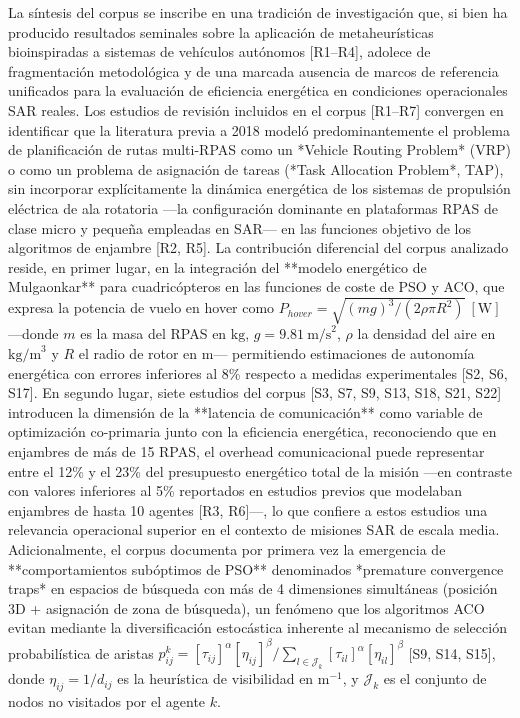La síntesis del corpus se inscribe en una tradición de investigación que, si bien ha producido resultados seminales sobre la aplicación de metaheurísticas bioinspiradas a sistemas de vehículos autónomos [R1–R4], adolece de fragmentación metodológica y de una marcada ausencia de marcos de referencia unificados para la evaluación de eficiencia energética en condiciones operacionales SAR reales. Los estudios de revisión incluidos en el corpus [R1–R7] convergen en identificar que la literatura previa a 2018 modeló predominantemente el problema de planificación de rutas multi-RPAS como un *Vehicle Routing Problem* (VRP) o como un problema de asignación de tareas (*Task Allocation Problem*, TAP), sin incorporar explícitamente la dinámica energética de los sistemas de propulsión eléctrica de ala rotatoria —la configuración dominante en plataformas RPAS de clase micro y pequeña empleadas en SAR— en las funciones objetivo de los algoritmos de enjambre [R2, R5]. La contribución diferencial del corpus analizado reside, en primer lugar, en la integración del **modelo energético de Mulgaonkar** para cuadricópteros en las funciones de coste de PSO y ACO, que expresa la potencia de vuelo en hover como $P_{hover} = \sqrt{(mg)^3 / (2\rho \pi R^2)}\ [\text{W}]$ —donde $m$ es la masa del RPAS en $\text{kg}$, $g = 9.81\ \text{m/s}^2$, $\rho$ la densidad del aire en $\text{kg/m}^3$ y $R$ el radio de rotor en $\text{m}$— permitiendo estimaciones de autonomía energética con errores inferiores al 8\% respecto a medidas experimentales [S2, S6, S17]. En segundo lugar, siete estudios del corpus [S3, S7, S9, S13, S18, S21, S22] introducen la dimensión de la **latencia de comunicación** como variable de optimización co-primaria junto con la eficiencia energética, reconociendo que en enjambres de más de 15 RPAS, el overhead comunicacional puede representar entre el 12\% y el 23\% del presupuesto energético total de la misión —en contraste con valores inferiores al 5\% reportados en estudios previos que modelaban enjambres de hasta 10 agentes [R3, R6]—, lo que confiere a estos estudios una relevancia operacional superior en el contexto de misiones SAR de escala media. Adicionalmente, el corpus documenta por primera vez la emergencia de **comportamientos subóptimos de PSO** denominados *premature convergence traps* en espacios de búsqueda con más de 4 dimensiones simultáneas (posición 3D + asignación de zona de búsqueda), un fenómeno que los algoritmos ACO evitan mediante la diversificación estocástica inherente al mecanismo de selección probabilística de aristas $p_{ij}^k = [\tau_{ij}]^\alpha [\eta_{ij}]^\beta / \sum_{l \in \mathcal{J}_k} [\tau_{il}]^\alpha [\eta_{il}]^\beta$ [S9, S14, S15], donde $\eta_{ij} = 1/d_{ij}$ es la heurística de visibilidad en $\text{m}^{-1}$, y $\mathcal{J}_k$ es el conjunto de nodos no visitados por el agente $k$.

